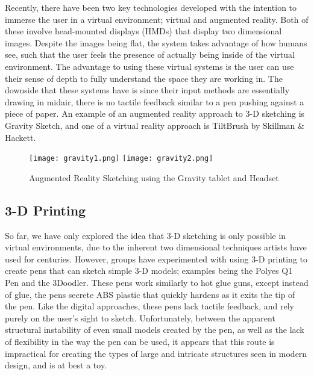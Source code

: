 Recently, there have been two key technologies developed with the intention to immerse the user in a virtual environment; virtual and augmented reality. 
Both of these involve head-mounted displays (HMDs) that display two dimensional images.
Despite the images being flat, the system takes advantage of how humans see, such that the user feels the presence of actually being inside of the virtual environment.
The advantage to using these virtual systems is the user can use their sense of depth to fully understand the space they are working in.
The downside that these systems have is since their input methods are essentially drawing in midair, there is no tactile feedback similar to a pen pushing against a piece of paper.
An example of an augmented reality approach to 3-D sketching is Gravity Sketch, and one of a virtual reality approach is TiltBrush  by Skillman \& Hackett.

\begin{figure}
\texttt{[image: gravity1.png]}
\texttt{[image: gravity2.png]}
\caption{Augmented Reality Sketching using the Gravity tablet and Headset}
\end{figure}

\subsection{3-D Printing}

So far, we have only explored the idea that 3-D sketching is only possible in virtual environments, due to the inherent two dimensional techniques artists have used for centuries.  
However, groups have experimented with using 3-D printing to create pens that can sketch simple 3-D models; examples being the Polyes Q1 Pen and the 3Doodler.
These pens work similarly to hot glue guns, except instead of glue, the pens secrete ABS plastic that quickly hardens as it exits the tip of the pen.
Like the digital approaches, these pens lack tactile feedback, and rely purely on the user's sight to sketch.
Unfortunately, between the apparent structural instability of even small models created by the pen, as well as the lack of flexibility in the way the pen can be used, it appears that this route is impractical for creating the types of large and intricate structures seen in modern design, and is at best a toy.